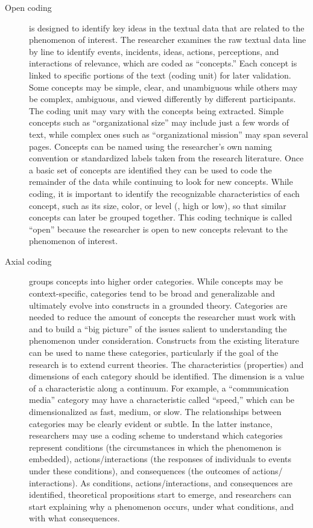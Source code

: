 \begin{description}

\item[Open coding] is designed to identify key ideas in the textual data that are related to the phenomenon of interest. The researcher examines the raw textual data line by line to identify events, incidents, ideas, actions, perceptions, and interactions of relevance, which are coded as ``concepts.'' Each concept is linked to specific portions of the text (coding unit) for later validation. Some concepts may be simple, clear, and unambiguous while others may be complex, ambiguous, and viewed differently by different participants. The coding unit may vary with the concepts being extracted. Simple concepts such as ``organizational size'' may include just a few words of text, while complex ones such as ``organizational mission'' may span several pages. Concepts can be named using the researcher's own naming convention or standardized labels taken from the research literature. Once a basic set of concepts are identified they can be used to code the remainder of the data while continuing to look for new concepts. While coding, it is important to identify the recognizable characteristics of each concept, such as its size, color, or level (\eg, high or low), so that similar concepts can later be grouped together. This coding technique is called ``open'' because the researcher is open to new concepts relevant to the phenomenon of interest.

\item[Axial coding] groups concepts into higher order categories. While concepts may be context-specific, categories tend to be broad and generalizable and ultimately evolve into constructs in a grounded theory. Categories are needed to reduce the amount of concepts the researcher must work with and to build a ``big picture'' of the issues salient to understanding the phenomenon under consideration. Constructs from the existing literature can be used to name these categories, particularly if the goal of the research is to extend current theories. The characteristics (properties) and dimensions of each category should be identified. The dimension is a value of a characteristic along a continuum. For example, a ``communication media'' category may have a characteristic called ``speed,'' which can be dimensionalized as fast, medium, or slow. The relationships between categories may be clearly evident or subtle. In the latter instance, researchers may use a coding scheme to understand which categories represent conditions (the circumstances in which the phenomenon is embedded), actions/interactions (the responses of individuals to events under these conditions), and consequences (the outcomes of actions/ interactions). As conditions, actions/interactions, and consequences are identified, theoretical propositions start to emerge, and researchers can start explaining why a phenomenon occurs, under what conditions, and with what consequences.


\end{description}
